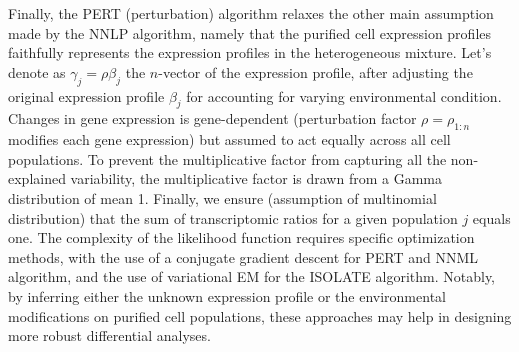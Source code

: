 Finally, the PERT (perturbation) algorithm relaxes the other main
assumption made by the NNLP algorithm, namely that the purified cell
expression profiles faithfully represents the expression profiles in the
heterogeneous mixture. Let's denote as \(\gamma_j = \rho \beta_j\) the
\(n\)-vector of the expression profile, after adjusting the original
expression profile \(\beta_j\) for accounting for varying environmental
condition. Changes in gene expression is gene-dependent (perturbation
factor \(\rho=\rho_{1:n}\) modifies each gene expression) but assumed to
act equally across all cell populations. To prevent the multiplicative
factor from capturing all the non-explained variability, the
multiplicative factor is drawn from a Gamma distribution of mean 1.
Finally, we ensure (assumption of multinomial distribution) that the sum
of transcriptomic ratios for a given population \(j\) equals one. The
complexity of the likelihood function requires specific optimization
methods, with the use of a conjugate gradient descent for PERT and NNML
algorithm, and the use of variational EM for the ISOLATE algorithm.
Notably, by inferring either the unknown expression profile or the
environmental modifications on purified cell populations, these
approaches may help in designing more robust differential analyses.


